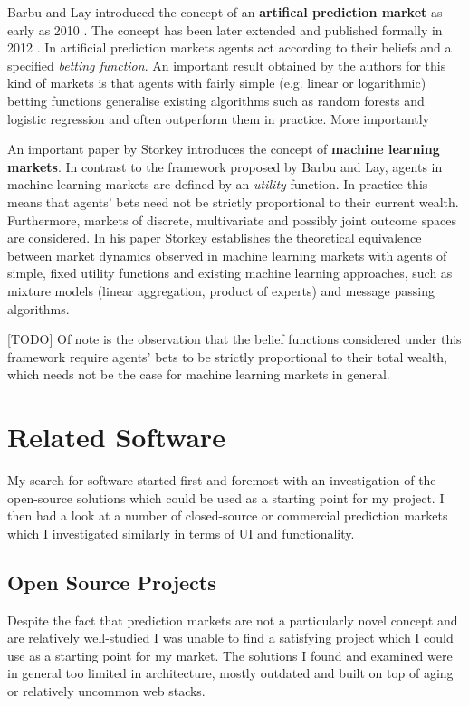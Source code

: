 \documentclass[bsc,frontabs,twoside,singlespacing,parskip,deptreport]{infthesis}     %
\begin{document}
	Barbu and Lay introduced the concept of an {\bf artifical prediction market} as early as 2010 \cite{barbu_supervised_2010}. The concept has been later extended and published formally in 2012 \cite{barbu_introduction_2012}. In artificial prediction markets agents act according to their beliefs and a specified {\em betting function}. An important result obtained by the authors for this kind of markets is that agents with fairly simple (e.g. linear or logarithmic) betting functions generalise existing algorithms such as random forests and logistic regression and often outperform them in practice. More importantly 

	An important paper by Storkey \cite{storkey_machine_2011} introduces the concept of {\bf machine learning markets}. In contrast to the framework proposed by Barbu and Lay, agents in machine learning markets are defined by an {\em utility} function. In practice this means that agents' bets need not be strictly proportional to their current wealth. Furthermore, markets of discrete, multivariate and possibly joint outcome spaces are considered. In his paper Storkey establishes the theoretical equivalence between market dynamics observed in machine learning markets with agents of simple, fixed utility functions and existing machine learning approaches, such as mixture models (linear aggregation, product of experts) and message passing algorithms. 

[TODO] Of note is the observation that the belief functions considered under this framework require agents' bets to be strictly proportional to their total wealth, which needs not be the case for machine learning markets in general. 


\chapter{Related Software}


%
    My search for software started first and foremost with an investigation of the open-source solutions which could be used as a starting point for my project. I then had a look at a number of closed-source or commercial prediction markets which I investigated similarly in terms of UI and functionality.   
    
\section{Open Source Projects}
    Despite the fact that prediction markets are not a particularly novel concept and are relatively well-studied I was unable to find a satisfying project which I could use as a starting point for my market. The solutions I found and examined were in general too limited in architecture, mostly outdated and built on top of aging or relatively uncommon web stacks.
\end{document}
